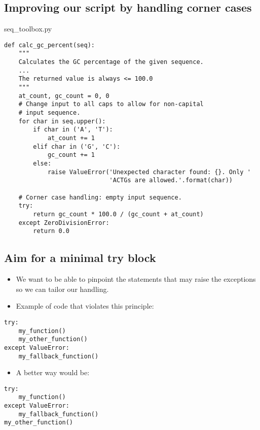 \documentclass[aspectratio=1610,slidestop]{beamer}
\begin{document}
\subsection{Improving our script by handling corner cases}
\begin{pframe}
 \begin{pythonfile}{seq\_toolbox.py}
  \begin{tiny}
  \begin{verbatim}
def calc_gc_percent(seq):
    """
    Calculates the GC percentage of the given sequence.
    ...
    The returned value is always <= 100.0
    """
    at_count, gc_count = 0, 0
    # Change input to all caps to allow for non-capital
    # input sequence.
    for char in seq.upper():
        if char in ('A', 'T'):
            at_count += 1
        elif char in ('G', 'C'):
            gc_count += 1
        else:
            raise ValueError('Unexpected character found: {}. Only '
                             'ACTGs are allowed.'.format(char))

    # Corner case handling: empty input sequence.
    try:
        return gc_count * 100.0 / (gc_count + at_count)
    except ZeroDivisionError:
        return 0.0
  \end{verbatim}
  \end{tiny}
 \end{pythonfile}
\end{pframe}


\subsection{Aim for a minimal try block}
\begin{pframe}
 \vspace{-0.5cm}
 \begin{itemize}
  \item We want to be able to pinpoint the statements that may raise the
  exceptions so we can tailor our handling.
  \item Example of code that violates this principle:
 \end{itemize}
 \vspace{-0.1cm}
 \begin{pythoncode}
   \begin{verbatim}
try:
    my_function()
    my_other_function()
except ValueError:
    my_fallback_function()
   \end{verbatim}
  \end{pythoncode}
 \begin{itemize}
  \item A better way would be:
 \end{itemize}
 \vspace{-0.1cm}
 \begin{pythoncode}
   \begin{verbatim}
try:
    my_function()
except ValueError:
    my_fallback_function()
my_other_function()
   \end{verbatim}
  \end{pythoncode}
\end{pframe}
\end{document}
